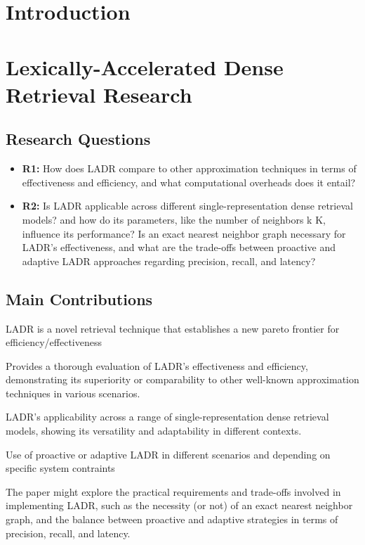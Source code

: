 \documentclass[sigconf,authorversion,nonacm]{acmart}
\begin{document}
\section{Introduction}
\section{Lexically-Accelerated Dense Retrieval Research }

\subsection{Research Questions}

\begin{itemize}
	\item \textbf{R1:} How does LADR compare to other approximation techniques in terms of effectiveness
	      and efficiency, and what computational overheads does it entail?
	\item \textbf{R2:} Is LADR applicable across different single-representation dense retrieval
	      models?
	      and how do its parameters, like the number of neighbors k K, influence its performance?
	      Is an exact nearest neighbor graph necessary for LADR's
	      effectiveness, and what are the trade-offs between proactive and adaptive LADR approaches
	      regarding precision, recall, and latency?
\end{itemize}


\subsection{Main Contributions}

LADR is a novel retrieval technique that establishes a new pareto
frontier for efficiency/effectiveness

Provides a thorough evaluation of LADR's effectiveness and
efficiency, demonstrating its superiority or comparability to other well-known approximation
techniques in various scenarios.

LADR's applicability across a range of single-representation dense
retrieval models, showing its versatility and adaptability in different contexts.

Use of proactive or adaptive LADR in different scenarios and depending on specific system
contraints

The paper might explore the practical requirements and trade-offs
involved in implementing LADR, such as the necessity (or not) of an exact nearest neighbor
graph, and the balance between proactive and adaptive strategies in terms of precision,
recall, and latency.
\end{document}
